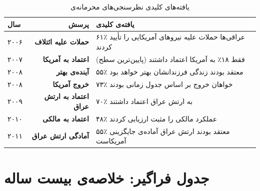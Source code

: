 \begin{table}[H]
\centering
\caption{یافته‌های کلیدی نظرسنجی‌های محرمانه‌ی }
\label{tab:d3-findings}
\small
\begin{tabularx}{\textwidth}{>{\centering\arraybackslash\small}p{1.2cm} >{\bfseries\small}r >{\small}X}
\toprule
\textbf{سال} & \textbf{پرسش} & \textbf{یافته‌ی کلیدی} \\
\midrule
۲۰۰۶ & حملات علیه ائتلاف & ۶۱٪ عراقی‌ها حملات علیه نیروهای آمریکایی را تأیید کردند \\
\addlinespace
۲۰۰۷ & اعتماد به آمریکا & فقط ۱۸٪ به آمریکا اعتماد داشتند (پایین‌ترین سطح) \\
\addlinespace
۲۰۰۸ & آینده‌ی بهتر & ۵۵٪ معتقد بودند زندگی فرزندانشان بهتر خواهد بود \\
\addlinespace
۲۰۰۸ & خروج آمریکا & ۷۳٪ خواهان خروج بر اساس جدول زمانی بودند \\
\addlinespace
۲۰۰۹ & اعتماد به ارتش عراق & ۷۰٪ به ارتش عراق اعتماد داشتند \\
\addlinespace
۲۰۱۰ & اعتماد به مالکی & ۴۸٪ عملکرد مالکی را مثبت ارزیابی کردند \\
\addlinespace
۲۰۱۱ & آمادگی ارتش عراق & ۵۵٪ معتقد بودند ارتش عراق آماده‌ی جایگزینی آمریکاست \\
\bottomrule
\end{tabularx}
\end{table}



\section{جدول فراگیر: خلاصه‌ی بیست ساله}

